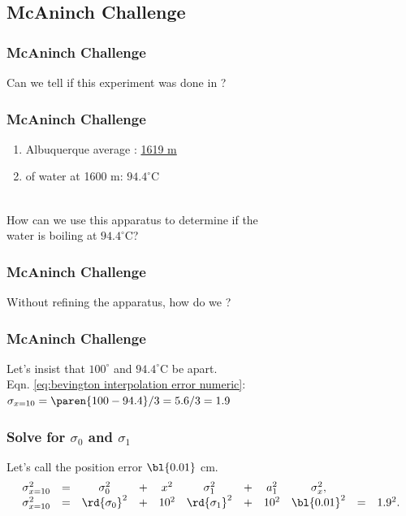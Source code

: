 % 

\subsection{McAninch Challenge}
%
\begin{frame}\frametitle{McAninch Challenge}
Can we tell if this experiment was done in ?
\end{frame}
%
%
\begin{frame}\frametitle{McAninch Challenge}
\begin{enumerate}
	\item Albuquerque average : \href{https://en.wikipedia.org/wiki/Albuquerque,_New_Mexico}{1619 m}
	\item {} of water at 1600 m: $94.4^{\circ}$C
\end{enumerate}
%
\center
\ \\
How can we use this apparatus to determine if the \\ water is boiling at $94.4^{\circ}$C?
\end{frame}
%
%
\begin{frame}\frametitle{McAninch Challenge}
\center
Without refining the apparatus, how do we ?
\end{frame}
%
%
\begin{frame}\frametitle{McAninch Challenge}
\center
Let's insist that $100^{\circ}$ and $94.4^{\circ}$C be  apart.\\[20pt]
\pause
	Eqn. \eqref{eq:bevington interpolation error numeric}: $\sigma_{x=10} = \paren{100-94.4}/3 = 5.6 / 3 = 1.9$
\end{frame}
%
%
\begin{frame}\frametitle{Solve for $\sigma_{0}$ and $\sigma_{1}$}
Let's call the position error $\bl{0.01}$ cm.
%
\begin{equation}
\begin{array}{ccccc ccccc c}
	\sigma_{x=10}^{2} &=& \sigma_{0}^{2} &+& x^{2} & \sigma_{1}^{2} &+& a_{1}^{2} & \sigma_{x}^{2}, \\
	\sigma_{x=10}^{2} &=& \rd{\sigma_{0}}^{2} &+& 10^{2} & \rd{\sigma_{1}}^{2} &+& 10^{2} & \bl{0.01}^{2} &=& 1.9^{2}. \\
\end{array}
\label{eq:bevington interpolation error numeric}
\end{equation}
\end{frame}
